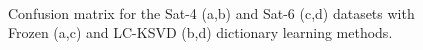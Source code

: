 \begin{figure}[!t]%
    \centering
    \qquad
    \\\label{fig: sat4_rslt}%
    
    
    \qquad
    \caption[]{Confusion matrix for the Sat-4 (a,b) and Sat-6 (c,d) datasets with Frozen (a,c) and LC-KSVD (b,d) dictionary learning methods.}%
    \label{fig: sat6_rslt}%
    \end{figure}
    
    
    
